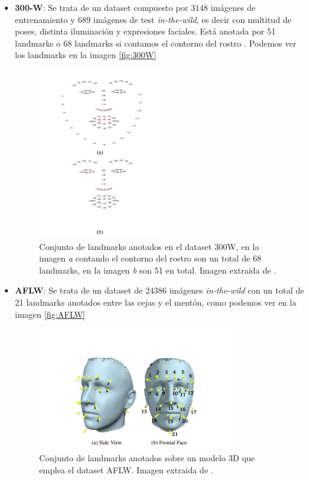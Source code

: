     \begin{itemize}
    \item \textbf{300-W}: Se trata de un dataset compuesto por $3148$ imágenes de entrenamiento y $689$ imágenes de test \textit{in-the-wild}, es decir con multitud de poses, distinta iluminación y expresiones faciales. Está anotada por 51 landmarks o 68 landmarks si contamos el contorno del rostro \cite{300W}. Podemos ver los landmarks en la imagen \autoref{fig:300W}
    
    \begin{figure}[h]
        \centering
        \includegraphics[width=0.5\textwidth]{img/33W.png}
        \caption{Conjunto de landmarks anotados en el dataset 300W, en la imagen \textit{a} contando el contorno del rostro son un total de 68 landmarks, en la imagen \textit{b} son 51 en total. Imagen extraida de \cite{300W}.}
        \label{fig:300W}
    \end{figure}
    
    \item \textbf{AFLW}: Se trata de un dataset de $24386$ imágenes \textit{in-the-wild} con un total de 21 landmarks anotados entre las cejas y el mentón, como podemos ver en la imagen \autoref{fig:AFLW}  \cite{AFLW}
    \begin{figure}[H]
        \centering
        \includegraphics[width=0.8\textwidth]{img/AFLW.png}
        \caption{Conjunto de landmarks anotados sobre un modelo $3$D que emplea el dataset AFLW. Imagen extraida de \cite{AFLW}.}
        \label{fig:AFLW}
    \end{figure}
    \end{itemize}

